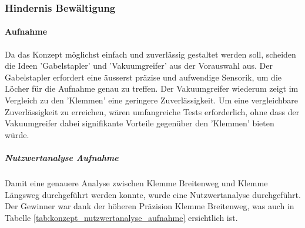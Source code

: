         
    \newpage
    \subsubsection{Hindernis Bewältigung}
        \paragraph{Aufnahme}
            Da das Konzept möglichst einfach und zuverlässig gestaltet werden soll, scheiden die Ideen 'Gabelstapler' und 'Vakuumgreifer' aus der Vorauswahl aus. Der Gabelstapler erfordert eine äusserst präzise und aufwendige Sensorik, um die Löcher für die Aufnahme genau zu treffen. Der Vakuumgreifer wiederum zeigt im Vergleich zu den 'Klemmen' eine geringere Zuverlässigkeit. Um eine vergleichbare Zuverlässigkeit zu erreichen, wären umfangreiche Tests erforderlich, ohne dass der Vakuumgreifer dabei signifikante Vorteile gegenüber den 'Klemmen' bieten würde.

        \subparagraph{Nutzwertanalyse Aufnahme}
        Damit eine genauere Analyse zwischen Klemme Breitenweg und Klemme Längsweg durchgeführt werden konnte, wurde eine Nutzwertanalyse durchgeführt. Der Gewinner war dank der höheren Präzision Klemme Breitenweg, was auch in Tabelle \ref{tab:konzept_nutzwertanalyse_aufnahme} ersichtlich ist.
        
